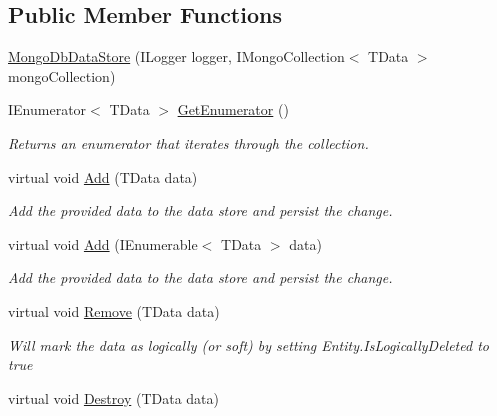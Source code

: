\subsection*{Public Member Functions}
\begin{DoxyCompactItemize}
\item 
\hyperlink{classCqrs_1_1MongoDB_1_1DataStores_1_1MongoDbDataStore_a039b75f6f011fa89b5dd724bee6b64cb_a039b75f6f011fa89b5dd724bee6b64cb}{Mongo\+Db\+Data\+Store} (I\+Logger logger, I\+Mongo\+Collection$<$ T\+Data $>$ mongo\+Collection)
\item 
I\+Enumerator$<$ T\+Data $>$ \hyperlink{classCqrs_1_1MongoDB_1_1DataStores_1_1MongoDbDataStore_a2bab987d4d7f3c6b2ab3a3e04878cf98_a2bab987d4d7f3c6b2ab3a3e04878cf98}{Get\+Enumerator} ()
\begin{DoxyCompactList}\small\item\em Returns an enumerator that iterates through the collection. \end{DoxyCompactList}\item 
virtual void \hyperlink{classCqrs_1_1MongoDB_1_1DataStores_1_1MongoDbDataStore_affcb1268469b99963501dd8c58e4a480_affcb1268469b99963501dd8c58e4a480}{Add} (T\+Data data)
\begin{DoxyCompactList}\small\item\em Add the provided {\itshape data}  to the data store and persist the change. \end{DoxyCompactList}\item 
virtual void \hyperlink{classCqrs_1_1MongoDB_1_1DataStores_1_1MongoDbDataStore_a709fc1e29d266a7c19a46bd181d03963_a709fc1e29d266a7c19a46bd181d03963}{Add} (I\+Enumerable$<$ T\+Data $>$ data)
\begin{DoxyCompactList}\small\item\em Add the provided {\itshape data}  to the data store and persist the change. \end{DoxyCompactList}\item 
virtual void \hyperlink{classCqrs_1_1MongoDB_1_1DataStores_1_1MongoDbDataStore_a14b43546e8d1e1832358e1cf2f8535f1_a14b43546e8d1e1832358e1cf2f8535f1}{Remove} (T\+Data data)
\begin{DoxyCompactList}\small\item\em Will mark the {\itshape data}  as logically (or soft) by setting Entity.\+Is\+Logically\+Deleted to true \end{DoxyCompactList}\item 
virtual void \hyperlink{classCqrs_1_1MongoDB_1_1DataStores_1_1MongoDbDataStore_a4650c780f34e320ba39f312e3b04555d_a4650c780f34e320ba39f312e3b04555d}{Destroy} (T\+Data data)

\end{DoxyCompactItemize}
